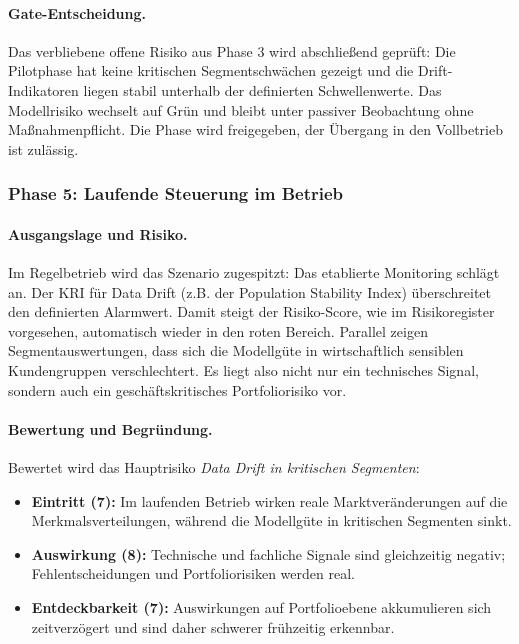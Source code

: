 \paragraph*{Gate-Entscheidung.}
Das verbliebene offene Risiko aus Phase 3 wird abschließend geprüft:
Die Pilotphase hat keine kritischen Segmentschwächen gezeigt
und die Drift-Indikatoren liegen stabil unterhalb der definierten Schwellenwerte.
Das Modellrisiko wechselt auf Grün und bleibt unter passiver Beobachtung ohne Maßnahmenpflicht.
Die Phase wird freigegeben, der Übergang in den Vollbetrieb ist zulässig.

\subsubsection{Phase 5: Laufende Steuerung im Betrieb}
\paragraph*{Ausgangslage und Risiko.}
Im Regelbetrieb wird das Szenario zugespitzt:
Das etablierte Monitoring schlägt an.
Der KRI für Data Drift (z.B. der Population Stability Index)
überschreitet den definierten Alarmwert.
Damit steigt der Risiko-Score,
wie im Risikoregister vorgesehen,
automatisch wieder in den roten Bereich.
Parallel zeigen Segmentauswertungen,
dass sich die Modellgüte in wirtschaftlich sensiblen Kundengruppen verschlechtert.
Es liegt also nicht nur ein technisches Signal,
sondern auch ein geschäftskritisches Portfoliorisiko vor.

\paragraph*{Bewertung und Begründung.}
Bewertet wird das Hauptrisiko \textit{Data Drift in kritischen Segmenten}:
\begin{itemize}
  \item \textbf{Eintritt (7):} Im laufenden Betrieb wirken reale Marktveränderungen auf die Merkmalsverteilungen, während die Modellgüte in kritischen Segmenten sinkt.
  \item \textbf{Auswirkung (8):} Technische und fachliche Signale sind gleichzeitig negativ; Fehlentscheidungen und Portfoliorisiken werden real.
  \item \textbf{Entdeckbarkeit (7):} Auswirkungen auf Portfolioebene akkumulieren sich zeitverzögert und sind daher schwerer frühzeitig erkennbar.
\end{itemize}


